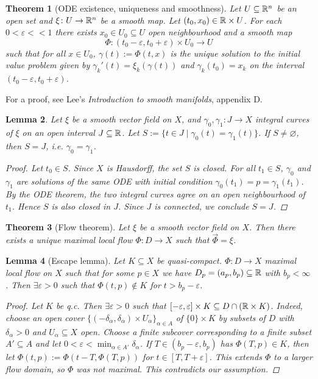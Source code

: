 \documentclass[A4paper, british, reqno]{amsart}
\theoremstyle{darkgreentheorem}
\newtheorem{thm}{Theorem}[section]
\newtheorem{lm}[thm]{Lemma}
\theoremstyle{darkbluedefinition}
\theoremstyle{darkredexample}
\theoremstyle{remark}
\newcommand{\1}{\mathbbm{1}}
\newcommand{\tms}{\times}
\newcommand{\sub}{\subseteq}
\begin{document}
\begin{thm}[ODE existence, uniqueness and smoothness]
    Let $U\sub \R^{n}$ be an open set and $\xi\colon U\to \mathbb{R}^{n}$ be a smooth map.
    Let $(t_{0},x_{0})\in \R\tms U$.
    For each $0<\varepsilon <<1$ there exists $x_{0}\in U_{0}\sub U$ open neighbourhood and a smooth map
    \[ \Phi\colon (t_{0}-\varepsilon,t_{0}+\varepsilon)\tms U_{0}\to U \]
    such that for all $x\in U_{0}$, $\gamma(t):=\Phi(t,x)$ is the unique solution to the initial value problem given by $\gamma_{k}'(t)=\xi_{k}(\gamma(t))$ and $\gamma_{k}(t_{0})=x_{k}$ on the interval $(t_{0}-\varepsilon ,t_{0}+\varepsilon )$.
\end{thm}

For a proof, see Lee's \textit{Introduction to smooth manifolds}, appendix D.

\begin{lm}
    Let $\xi$ be a smooth vector field on $X$, and $\gamma_{0},\gamma_{1}\colon J\to X$ integral curves of $\xi$ on an open interval $J\sub \R$.
    Let $S:=\{t\in J\mid \gamma_{0}(t)=\gamma_{1}(t)\}$.
    If $S\neq \varnothing$, then $S=J$, i.e. $\gamma_{0}=\gamma_{1}$.
    \begin{proof}
	Let $t_{0}\in S$.
	Since $X$ is Hausdorff, the set $S$ is closed.
	For all $t_{1}\in S$, $\gamma_{0}$ and $\gamma_{1}$ are solutions of the same ODE with initial condition $\gamma_{0}(t_{1})=p=\gamma_{1}(t_{1})$.
	By the ODE theorem, the two integral curves agree on an open neighbourhood of $t_{1}$.
	Hence $S$ is also closed in $J$.
	Since $J$ is connected, we conclude $S=J$.
    \end{proof}
\end{lm}

\begin{thm}[Flow theorem]
    Let $\xi$ be a smooth vector field on $X$.
    Then there exists a unique maximal local flow $\Phi\colon D\to X$ such that $\vec{\Phi}=\xi$.
\end{thm}

\begin{lm}[Escape lemma]
    Let $K\sub X$ be quasi-compact.
    $\Phi\colon D\to X$ maximal local flow on $X$ such that for some $p\in X$ we have $D_{p}=(a_{p},b_{p})\sub \R$ with $b_{p}<\infty$.
    Then $\exists \varepsilon >0$ such that $\Phi(t,p)\not\in K$ for $t>b_{p}-\varepsilon$.
    \begin{proof}
	Let $K$ be q.c.
	Then $\exists \varepsilon >0$ such that $[-\varepsilon,\varepsilon ]\tms K\sub D\cap (\R\tms K)$.
	Indeed, choose an open cover $\{(-\delta_{\alpha},\delta_{\alpha})\tms U_{\alpha}\}_{\alpha\in A}$ of $\{0\}\tms K$ by subsets of $D$ with $\delta_{\alpha}>0$ and $U_{\alpha}\sub X$ open.
	Choose a finite subcover corresponding to a finite subset $A'\sub A$ and let $0<\varepsilon <\min_{\alpha\in A'}{\delta_{\alpha}}$.
	If $T\in (b_{p}-\varepsilon,b_{p})$ has $\Phi(T,p)\in K$, then let $\Phi(t,p):=\Phi(t-T,\Phi(T,p))$ for $t\in [T,T+\varepsilon ]$.
	This extends $\Phi$ to a larger flow domain, so $\Phi$ was not maximal.
	This contradicts our assumption.
    \end{proof}
\end{lm}
\end{document}
